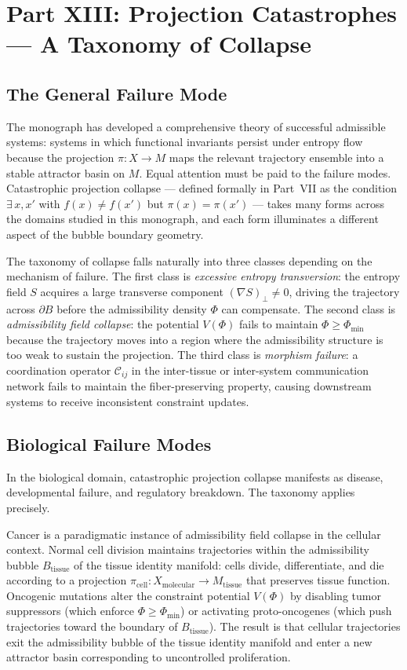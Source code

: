 \documentclass[12pt, a4paper]{article}
\theoremstyle{essaystyle}
\begin{document}
\section{Part XIII: Projection Catastrophes --- A Taxonomy of Collapse}

\subsection{The General Failure Mode}

The monograph has developed a comprehensive theory of successful admissible systems:
systems in which functional invariants persist under entropy flow because the projection
$\pi : X \to M$ maps the relevant trajectory ensemble into a stable attractor basin
on $M$. Equal attention must be paid to the failure modes. Catastrophic projection
collapse --- defined formally in Part~VII as the condition $\exists\, x, x'$ with
$f(x) \neq f(x')$ but $\pi(x) = \pi(x')$ --- takes many forms across the domains
studied in this monograph, and each form illuminates a different aspect of the
bubble boundary geometry.

The taxonomy of collapse falls naturally into three classes depending on the mechanism
of failure. The first class is \emph{excessive entropy transversion}: the entropy
field $S$ acquires a large transverse component $(\nabla S)_\perp \neq 0$, driving
the trajectory across $\partial B$ before the admissibility density $\Phi$ can
compensate. The second class is \emph{admissibility field collapse}: the potential
$V(\Phi)$ fails to maintain $\Phi \geq \Phi_{\min}$ because the trajectory moves
into a region where the admissibility structure is too weak to sustain the projection.
The third class is \emph{morphism failure}: a coordination operator $\mathcal{C}_{ij}$
in the inter-tissue or inter-system communication network fails to maintain the
fiber-preserving property, causing downstream systems to receive inconsistent
constraint updates.

\subsection{Biological Failure Modes}

In the biological domain, catastrophic projection collapse manifests as disease,
developmental failure, and regulatory breakdown. The taxonomy applies precisely.

Cancer is a paradigmatic instance of admissibility field collapse in the cellular
context. Normal cell division maintains trajectories within the admissibility bubble
$B_{\mathrm{tissue}}$ of the tissue identity manifold: cells divide, differentiate,
and die according to a projection $\pi_{\mathrm{cell}} : X_{\mathrm{molecular}} \to
M_{\mathrm{tissue}}$ that preserves tissue function. Oncogenic mutations alter the
constraint potential $V(\Phi)$ by disabling tumor suppressors (which enforce
$\Phi \geq \Phi_{\min}$) or activating proto-oncogenes (which push trajectories
toward the boundary of $B_{\mathrm{tissue}}$). The result is that cellular trajectories
exit the admissibility bubble of the tissue identity manifold and enter a new
attractor basin corresponding to uncontrolled proliferation.
\end{document}
